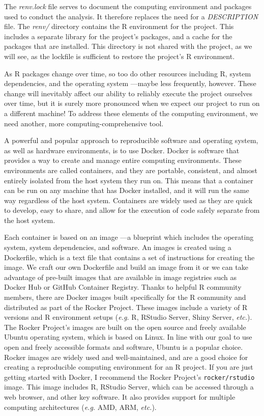 \documentclass[
  letterpaper,
  krantz1]{latex/krantz-mod}
\theoremstyle{definition}
\theoremstyle{definition}
\theoremstyle{remark}
\begin{document}
The \emph{renv.lock} file serves to document the computing environment
and packages used to conduct the analysis. It therefore replaces the
need for a \emph{DESCRIPTION} file. The \emph{renv/} directory contains
the R environment for the project. This includes a separate library for
the project's packages, and a cache for the packages that are installed.
This directory is not shared with the project, as we will see, as the
lockfile is sufficient to restore the project's R environment.

As R packages change over time, so too do other resources including R,
system dependencies, and the operating
system ---maybe less frequently, however. These
change will inevitably affect our ability to reliably execute the
project ourselves over time, but it is surely more pronounced when we
expect our project to run on a different machine! To address these
elements of the computing environment, we
need another, more computing-comprehensive tool.

A powerful and popular approach to reproducible software and operating
system, as well as hardware environments, is to use Docker. Docker is
software that provides a way to create and manage entire computing
environments. These environments are called
containers, and they are portable, consistent,
and almost entirely isolated from the host system they run on. This
means that a container can be run on any machine that has Docker
installed, and it will run the same way regardless of the host system.
Containers are widely used as they are quick to develop, easy to share,
and allow for the execution of code safely separate from the host
system.

Each container is based on an image ---a blueprint which includes the
operating system, system dependencies, and software. An images is
created using a Dockerfile, which is a text file that contains a set of
instructions for creating the image. We craft our own Dockerfile and
build an image from it or we can take advantage of pre-built images that
are available in image registries such as Docker Hub or GitHub Container
Registry. Thanks to helpful R community members,
there are Docker images built specifically for the R community and
distributed as part of the Rocker Project. These images include a
variety of R versions and R environment setups (\emph{e.g.} R, RStudio
Server, Shiny Server, \emph{etc.}). The Rocker Project's images are
built on the open source and freely available Ubuntu
operating system, which is based on Linux. In line with our goal to use
open and freely accessible formats and software, Ubuntu is a popular
choice. Rocker images are widely used and well-maintained, and are a
good choice for creating a reproducible computing environment for an R
project. If you are just getting started with Docker, I recommend the
Rocker Project's \texttt{rocker/rstudio} image. This image includes R,
RStudio Server, which can be accessed through a web browser, and other
key software. It also provides support for multiple computing
architectures (\emph{e.g.} AMD, ARM, \emph{etc.}).
\end{document}
